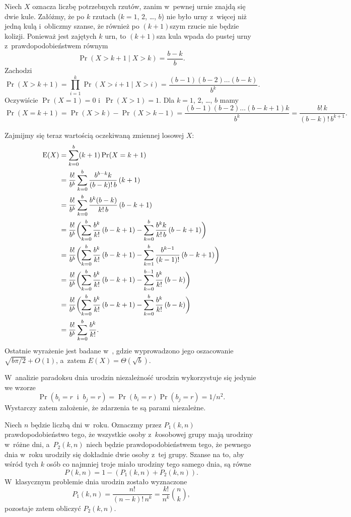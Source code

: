 \exercise %
Niech $X$ oznacza liczbę potrzebnych rzutów, zanim w~pewnej urnie znajdą się dwie kule.
Załóżmy, że po $k$ rzutach ($k=1$, 2, \dots, $b$) nie było urny z~więcej niż jedną kulą i~obliczmy szanse, że również po $(k+1)$\nbhyphen szym rzucie nie będzie kolizji.
Ponieważ jest zajętych $k$ urn, to $(k+1)$\nbhyphen sza kula wpada do pustej urny z~prawdopodobieństwem równym
\[
	\Pr(X>k+1\mid X>k) = \frac{b-k}{b}.
\]
Zachodzi
\[
	\Pr(X>k+1) = \prod_{i=1}^k\Pr(X>i+1\mid X>i) = \frac{(b-1)(b-2)\dots(b-k)}{b^k}.
\]
Oczywiście $\Pr(X=1)=0$ i~$\Pr(X>1)=1$.
Dla $k=1$, 2, \dots, $b$ mamy
\[
	\Pr(X=k+1) = \Pr(X>k)-\Pr(X>k-1) = \frac{(b-1)(b-2)\dots(b-k+1)k}{b^k} = \frac{b!\,k}{(b-k)!\,b^{k+1}}.
\]

Zajmijmy się teraz wartością oczekiwaną zmiennej losowej $X$:
\begin{align*}
	\operatorname{E}(X) &= \sum_{k=0}^b(k+1)\Pr(X=k+1) \\
	&= \frac{b!}{b^b}\sum_{k=0}^b\frac{b^{b-k}k}{(b-k)!\,b}\,(k+1) \\
	&= \frac{b!}{b^b}\sum_{k=0}^b\frac{b^k(b-k)}{k!\,b}\,(b-k+1) \\
	&= \frac{b!}{b^b}\biggl(\sum_{k=0}^b\frac{b^k}{k!}\,(b-k+1)-\sum_{k=0}^b\frac{b^kk}{k!\,b}\,(b-k+1)\biggr) \\
	&= \frac{b!}{b^b}\biggl(\sum_{k=0}^b\frac{b^k}{k!}\,(b-k+1)-\sum_{k=1}^b\frac{b^{k-1}}{(k-1)!}\,(b-k+1)\biggr) \\
	&= \frac{b!}{b^b}\biggl(\sum_{k=0}^b\frac{b^k}{k!}\,(b-k+1)-\sum_{k=0}^{b-1}\frac{b^k}{k!}\,(b-k)\biggr) \\
	&= \frac{b!}{b^b}\biggl(\sum_{k=0}^b\frac{b^k}{k!}\,(b-k+1)-\sum_{k=0}^b\frac{b^k}{k!}\,(b-k)\biggr) \\
	&= \frac{b!}{b^b}\sum_{k=0}^b\frac{b^k}{k!}.
\end{align*}
Ostatnie wyrażenie jest badane w~\cite{taocp1frag}, gdzie wyprowadzono jego oszacowanie $\sqrt{b\pi/2}+O(1)$, a~zatem $E(X)=\Theta(\!\sqrt{b})$.

\exercise %
W~analizie paradoksu dnia urodzin niezależność urodzin wykorzystuje się jedynie we wzorze
\[
    \Pr(b_i=r\;\;\text{i}\;\;b_j=r) = \Pr(b_i=r)\Pr(b_j=r) = 1/n^2.
\]
Wystarczy zatem założenie, że zdarzenia te są parami niezależne.

\exercise %
Niech $n$ będzie liczbą dni w~roku.
Oznaczmy przez $P_1(k,n)$ prawdopodobieństwo tego, że wszystkie osoby z~$k$\nbhyphen osobowej grupy mają urodziny w~różne dni, a~$P_2(k,n)$ niech będzie prawdopodobieństwem tego, że pewnego dnia w~roku urodziły się dokładnie dwie osoby z~tej grupy.
Szanse na to, aby wśród tych $k$ osób co najmniej troje miało urodziny tego samego dnia, są równe
\[
	P(k,n) = 1-(P_1(k,n)+P_2(k,n)).
\]
W~klasycznym problemie dnia urodzin zostało wyznaczone
\[
	P_1(k,n) = \frac{n!}{(n-k)!\,n^k} = \frac{k!}{n^k}\binom{n}{k},
\]
pozostaje zatem obliczyć $P_2(k,n)$.

